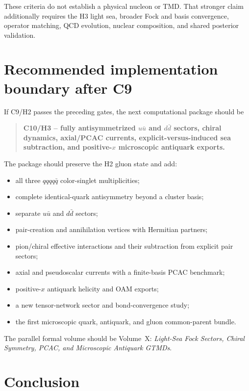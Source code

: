 \documentclass[11pt]{article}
\begin{document}
These criteria do not establish a physical nucleon or TMD.  That stronger
claim additionally requires the H3 light sea, broader Fock and basis
convergence, operator matching, QCD evolution, nuclear composition, and shared
posterior validation.

\section{Recommended implementation boundary after C9}

If C9/H2 passes the preceding gates, the next computational package should be

\begin{quote}
\textbf{C10/H3 -- fully antisymmetrized \(u\bar u\) and \(d\bar d\) sectors,
chiral dynamics, axial/PCAC currents, explicit-versus-induced sea subtraction,
and positive-\(x\) microscopic antiquark exports.}
\end{quote}

The package should preserve the H2 gluon state and add:
\begin{itemize}
 \item all three \(qqqq\bar q\) color-singlet multiplicities;
 \item complete identical-quark antisymmetry beyond a cluster basis;
 \item separate \(u\bar u\) and \(d\bar d\) sectors;
 \item pair-creation and annihilation vertices with Hermitian partners;
 \item pion/chiral effective interactions and their subtraction from explicit
 pair sectors;
 \item axial and pseudoscalar currents with a finite-basis PCAC benchmark;
 \item positive-\(x\) antiquark helicity and OAM exports;
 \item a new tensor-network sector and bond-convergence study;
 \item the first microscopic quark, antiquark, and gluon common-parent bundle.
\end{itemize}

The parallel formal volume should be Volume~X: \emph{Light-Sea Fock Sectors,
Chiral Symmetry, PCAC, and Microscopic Antiquark GTMDs}.

\section{Conclusion}
\end{document}
